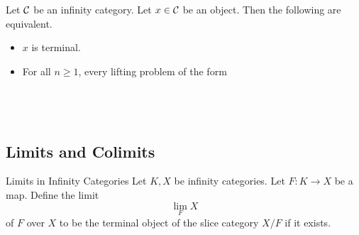 \documentclass[a4paper]{article}
\begin{document}
\begin{prp}{}{} Let $\mathcal{C}$ be an infinity category. Let $x\in\mathcal{C}$ be an object. Then the following are equivalent. 
\begin{itemize}
\item $x$ is terminal. 
\item For all $n\geq 1$, every lifting problem of the form \\~\\
\\~\\
\end{itemize}
\end{prp}

\subsection{Limits and Colimits}
\begin{defn}{Limits in Infinity Categories}{} Let $K,X$ be infinity categories. Let $F:K\to X$ be a map. Define the limit $$\lim_FX$$of $F$ over $X$ to be the terminal object of the slice category $X/F$ if it exists. 
\end{defn}
\end{document}
